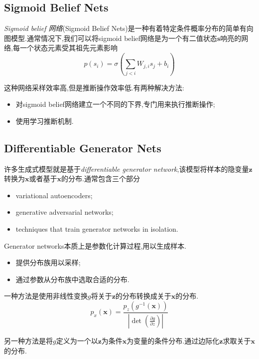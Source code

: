 \subsection{Sigmoid Belief Nets}

\textit{Sigmoid belief 网络}(Sigmoid Belief Nets)是一种有着特定条件概率分布的简单有向图模型.通常情况下,我们可以将sigmoid belief网络是为一个有二值状态$\bm s$响亮的网络,每一个状态元素受其祖先元素影响
\begin{equation}
p(s_i)=\sigma(\sum_{j<i}W_{j,i}s_j+b_i)
\end{equation}

这种网络采样效率高,但是推断操作效率低.有两种解决方法:
\begin{itemize}
    \item 对sigmoid belief网络建立一个不同的下界,专门用来执行推断操作;
    \item 使用学习推断机制.
\end{itemize}

\subsection{Differentiable Generator Nets}

许多生成式模型就是基于\textit{differentiable generator network},该模型将样本的隐变量$\mathbf z$转换为$\mathbf x$或者基于$\mathbf x$的分布.通常包含三个部分
\begin{itemize}
    \item  variational autoencoders;
    \item generative adversarial networks;
    \item techniques that train generator networks in isolation.
\end{itemize}

Generator networks本质上是参数化计算过程,用以生成样本.
\begin{itemize}
    \item 提供分布族用以采样;
    \item 通过参数从分布族中选取合适的分布.
\end{itemize}

一种方法是使用非线性变换$g$将关于$\mathbf z$的分布转换成关于$\mathbf x$的分布.
\begin{equation}
p_{x}(\bm x)=\frac{p_z(g^{-1}(\bm x))}{|\det (\frac{\partial g}{\partial z})|}
\end{equation}

另一种方法是将$g$定义为一个以$\mathbf z$为条件$\mathbf x$为变量的条件分布.通过边际化$\mathbf z$求取关于$\mathbf x$的分布.

